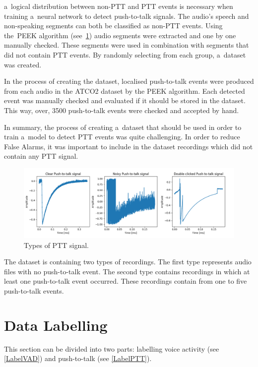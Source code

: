     a~logical distribution between non-PTT and PTT events is necessary when training a~neural network to detect push-to-talk signals. The audio's speech and non-speaking segments can both be classified as non-PTT events. Using the~PEEK algorithm (see~\ref{Labeling}) audio segments were extracted and one by one manually checked. These segments were used in combination with segments that did not contain PTT events. By randomly selecting from each group, a~dataset was created.

    In the process of creating the dataset, localised push-to-talk events were produced from each audio in the ATCO2 dataset by the PEEK algorithm. Each detected event was manually checked and evaluated if it should be stored in the dataset. This way, over, 3500 push-to-talk events were checked and accepted by hand. 

    In summary, the process of creating a~dataset that should be used in order to train a~model to detect PTT events was quite challenging. In order to reduce False Alarms, it was important to include in the dataset recordings which did not contain any PTT signal.



    \begin{figure}[ht!]
        \centering
        \includegraphics[width = \textwidth]{obrazky-figures/TypesOfPTT.png}
        \caption{Types of PTT signal.}
        \label{fig:typesPTT}
    \end{figure}

    The dataset is containing two types of recordings. The first type represents audio files with no push-to-talk event. The second type contains recordings in which at least one push-to-talk event occurred. These recordings contain from one to five push-to-talk events. 


\section{Data Labelling}\label{Labeling}

    This section can be divided into two parts: labelling voice activity (see \ref{LabelVAD}) and push-to-talk (see \ref{LabelPTT}). 
    
